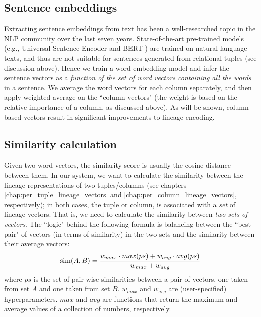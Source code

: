 \subsection{Sentence embeddings}\label{sec:sentence_embeddings} Extracting sentence embeddings from text has been a well-researched topic in the NLP community over the last seven years. State-of-the-art pre-trained models (e.g., Universal Sentence Encoder \cite{Cer2018UniversalSE, use_github} and BERT \cite{devlin2018bert}) are trained on natural language texts, and thus are not suitable for sentences generated from relational tuples (see discussion above). Hence we train a word embedding model and infer the sentence vectors as a \textit{function of the set of word vectors containing all the words} in a sentence. We average the word vectors for each column separately, and then apply weighted average on the ``column vectors" (the weight is based on the relative importance of a column, as discussed above). As will be shown, column-based vectors result in significant improvements to lineage encoding.
\subsection{Similarity calculation}\label{sec:similarity_calculation} Given two word vectors, the similarity score is usually the cosine distance between them. In our system, we want to calculate the similarity between the lineage representations of two tuples/columns (see chapters \ref{chap:per_tuple_lineage_vectors} and \ref{chap:per_column_lineage_vectors}, respectively); in both cases, the tuple or column, is associated with a \textit{set} of lineage vectors. That is, we need to calculate the similarity between \textit{two sets of vectors}\footnotemark. The ``logic" behind the following formula is balancing between the ``best pair" of vectors (in terms of similarity) in the two sets and the similarity between their average vectors:\\
\begin{equation*}
    \operatorname{sim}(A, B) = \frac{w_{max} \cdot max(ps) + w_{avg} \cdot avg(ps)}
    {w_{max} + w_{avg}}\\
\end{equation*}
where $ps$ is the set of pair-wise similarities between a pair of vectors, one taken from set $A$ and one taken from set $B$. $w_{max}$ and $w_{avg}$ are (user-specified) hyperparameters. $max$ and $avg$ are functions that return the maximum and average values of a collection of numbers, respectively\footnotemark.


